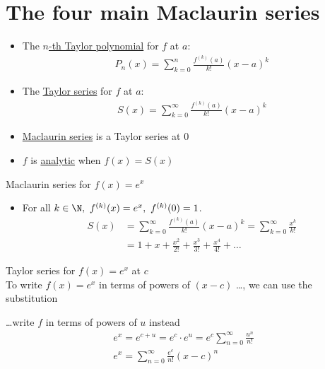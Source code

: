 \section{The four main Maclaurin series}
\begin{itemize}
    \item The \underline{\(n\)-th Taylor polynomial} for \(f\) at \(a\): \begin{align*}
              P_n(x) = \sum_{k = 0}^{n} \frac{f^{(k)}(a)}{k!} (x - a)^k
          \end{align*}
    \item The \underline{Taylor series} for \(f\) at \(a\): \begin{align*}
              S(x) = \sum_{k = 0}^{\infty} \frac{f^{(k)}(a)}{k!} (x - a)^k
          \end{align*}
    \item \underline{Maclaurin series} is a Taylor series at \(0\)
    \item \(f\) is \underline{analytic} when \(f(x) = S(x)\)
\end{itemize}
\eg Maclaurin series for \(f(x) = e^x\) \begin{itemize}
    \item For all \(k \in \N, ~ f^{(k)}(x) = e^x, ~ f^{(k)}(0) = 1\). \begin{align*}
              S(x) & = \sum_{k = 0}^{\infty} \frac{f^{(k)}(a)}{k!} (x - a)^k = \sum_{k = 0}^{\infty} \frac{x^k}{k!} \\
                   & = 1 + x + \frac{x^2}{2!} + \frac{x^3}{3!} + \frac{x^4}{4!} + \dots
          \end{align*}
\end{itemize}


\eg Taylor series for \(f(x) = e^x\) at \(c\) \\
To write \(f(x) = e^x\) in terms of powers of \((x-c)\) \dots, we can use the substitution \begin{center}
\end{center}
\dots write \(f\) in terms of powers of \(u\) instead \begin{align*}
    e^x = e^{c+u} = e^c \cdot e^u = e^c \sum_{n = 0}^{\infty} \frac{u^n}{n!} \\
    \boxed{e^x = \sum_{n = 0}^{\infty} \frac{e^c}{n!}(x-c)^n}
\end{align*}


